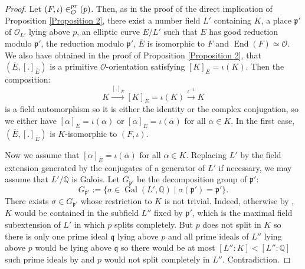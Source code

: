\documentclass[a4paper,10pt,notitlepage]{report}
\theoremstyle{definition}
\theoremstyle{plain}
\theoremstyle{definition}
\newcommand{\Q}{\mathbb{Q}}
\newcommand{\mO}{\mathcal{O}}
\renewcommand{\(}{\left(}
\renewcommand{\)}{\right)}
\newcommand{\mfp}{\mathfrak{p}}
\newcommand{\mfq}{\mathfrak{q}}
\DeclareMathOperator{\End}{End}
\let\SS\relax
\DeclareMathOperator{\SS}{SS}
\DeclareMathOperator{\Gal}{Gal}
\begin{document}
\begin{proof}
Let $(F,\iota)\in\SS_\mO^{pr}(p)$.  Then, as in the proof of the direct implication of Proposition \ref{Proposition 2}, there exist a number field $L'$ containing $K$, a place $\mfp'$ of $\mO_{L'}$ lying above $p$, an elliptic curve $E/L'$ such that $E$ has good reduction modulo $\mfp'$, the reduction modulo $\mfp'$,  $\overline{E}$ is isomorphic to $F$ and $\End(F)\simeq \mO$.  We also have obtained in the proof of Proposition \ref{Proposition 2}, that $(\overline{E},[.]_{\overline{E}})$ is a primitive $\mO$-orientation satisfying $[K]_{\overline{E}}=\iota(K)$. Then the composition:
\[K\overset{[.]_{\overline{E}}}{\longrightarrow}[K]_{\overline{E}}=\iota(K)\overset{\iota^{-1}}{\longrightarrow}K\]
is a field automorphism so it is either the identity or the complex conjugation, so we either have $[\alpha]_{\overline{E}}=\iota(\alpha)$ or $[\alpha]_{\overline{E}}=\iota(\overline{\alpha})$ for all $\alpha\in K$. In the first case, $(\overline{E},[.]_{\overline{E}})$ is $K$-isomorphic to $(F,\iota)$. 

Now we assume that $[\alpha]_{\overline{E}}=\iota(\overline{\alpha})$ for all $\alpha\in K$.  Replacing $L'$ by the field extension generated by the conjugates of a generator of $L'$ if necessary, we may assume that $L'/\Q$ is Galois.  Let $G_{\mfp'}$ be the decomposition group of $\mfp'$:
\[G_{\mfp'}:=\{\sigma\in\Gal(L',\Q)\mid \sigma(\mfp')=\mfp'\}.\]
There exists $\sigma\in G_{\mfp'}$ whose restriction to $K$ is not trivial.  Indeed, otherwise by \cite[Corollary I.3]{Lang_ANT}, $K$ would be contained in the subfield $L''$ fixed by $\mfp'$, which is the maximal field subextension of $L'$ in which $p$ splits completely.  But $p$ does not split in $K$ so there is only one prime ideal $\mfq$ lying above $p$ and all prime ideals of $L''$ lying above $p$ would be lying above $\mfq$ so there would be at most $[L'':K]<[L'':\Q]$ such prime ideals by \cite[chapter I, Proposition 11]{Lang_ANT} and $p$ would not split completely in $L''$.  Contradiction.


\end{proof}
\end{document}
